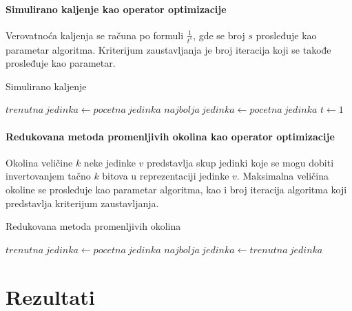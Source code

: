\documentclass[12pt, a4paper]{article}
\theoremstyle{definition}
\begin{document}
\paragraph{Simulirano kaljenje kao operator optimizacije}

Verovatnoća kaljenja se računa po formuli $\frac{1}{t^s}$, gde se broj $s$ prosleđuje kao parametar algoritma. Kriterijum zaustavljanja je broj iteracija koji se takođe prosleđuje kao parametar.

\begin{algorithm}
\caption{Simulirano kaljenje}
\label{alg:4}
$trenutna\ jedinka \gets pocetna\ jedinka$\;
$najbolja\ jedinka \gets pocetna\ jedinka$\;
$t \gets 1$\;
\end{algorithm}

\paragraph{Redukovana metoda promenljivih okolina kao operator optimizacije}

Okolina veličine $k$ neke jedinke $v$ predstavlja skup jedinki koje se mogu dobiti invertovanjem tačno $k$ bitova u reprezentaciji jedinke $v$. Maksimalna veličina okoline se prosleđuje kao parametar algoritma, kao i broj iteracija algoritma koji predstavlja kriterijum zaustavljanja.

\begin{algorithm}
\caption{Redukovana metoda promenljivih okolina}
\label{alg:5}
$trenutna\ jedinka \gets pocetna\ jedinka$\;
$najbolja\ jedinka \gets trenutna\ jedinka$\;
\end{algorithm}

\section{Rezultati}
\end{document}
